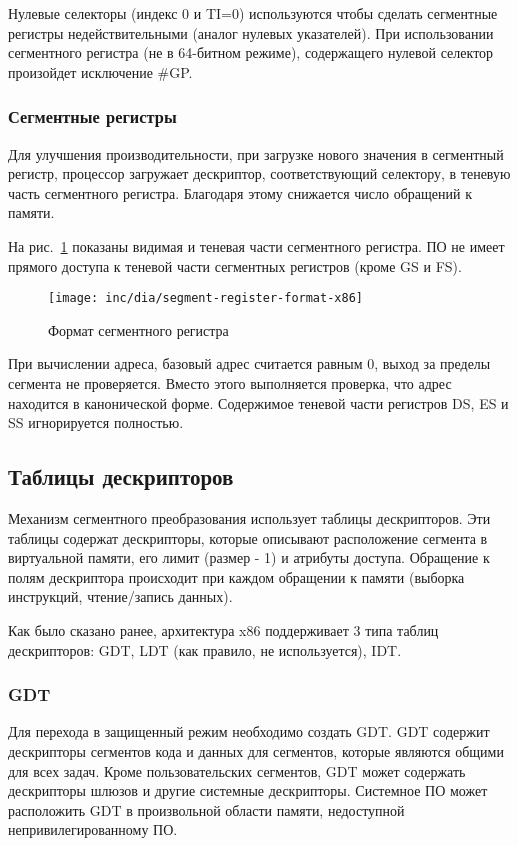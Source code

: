 Нулевые селекторы (индекс 0 и TI=0) используются чтобы сделать сегментные
регистры недействительными (аналог нулевых указателей).
При использовании сегментного регистра (не в 64-битном режиме),
содержащего нулевой селектор произойдет исключение \#GP.

\subsubsection*{Сегментные регистры}
Для улучшения производительности, при загрузке нового значения в сегментный регистр,
процессор загружает дескриптор, соответствующий селектору, в теневую часть сегментного регистра.
Благодаря этому снижается число обращений к памяти.

На рис.~\ref{fig:segment-register-format-x86} показаны видимая и теневая части сегментного регистра.
ПО не имеет прямого доступа к теневой части сегментных регистров (кроме GS и FS).

\begin{figure}[ht!]
  \centering
  \texttt{[image: inc/dia/segment-register-format-x86]}
  \caption{Формат сегментного регистра}
  \label{fig:segment-register-format-x86}
\end{figure}

При вычислении адреса, базовый адрес считается равным 0, выход за пределы сегмента не проверяется.
Вместо этого выполняется проверка, что адрес находится в канонической форме. Содержимое теневой части
регистров DS, ES и SS игнорируется полностью.

\subsection{Таблицы дескрипторов}
Механизм сегментного преобразования использует таблицы дескрипторов.
Эти таблицы содержат дескрипторы, которые описывают расположение сегмента в виртуальной памяти,
его лимит (размер - 1) и атрибуты доступа. Обращение к полям дескриптора происходит при каждом
обращении к памяти (выборка инструкций, чтение/запись данных).

Как было сказано ранее, архитектура x86 поддерживает 3 типа таблиц дескрипторов: GDT, LDT (как правило, не используется), IDT.

\subsubsection*{GDT}
Для перехода в защищенный режим необходимо создать GDT. GDT содержит дескрипторы
сегментов кода и данных для сегментов, которые являются общими для всех задач.
Кроме пользовательских сегментов, GDT может содержать дескрипторы шлюзов и
другие системные дескрипторы. Системное ПО может расположить GDT в произвольной
области памяти, недоступной непривилегированному ПО.

